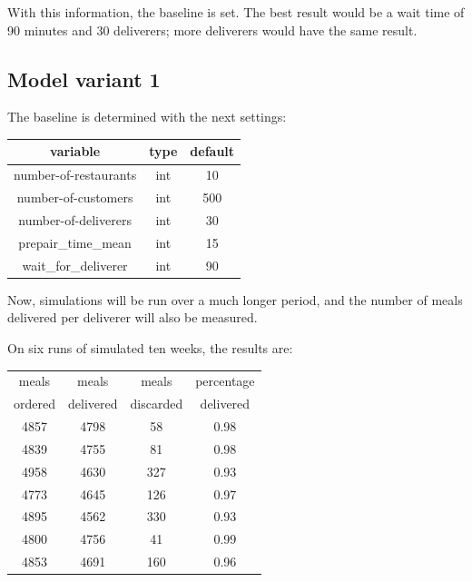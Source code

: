 With this information, the baseline is set.
The best result would be a wait time of 90 minutes and 30 deliverers; more deliverers would have the same result.

\subsection{Model variant 1}\label{subsec:model-variant-1}
The baseline is determined with the next settings:
\begin{center}
    \begin{tabular}{ |c|c|c| }
        \hline
        variable              & type & default \\
        \hline
        \hline
        number-of-restaurants & int  & 10      \\
        \hline
        number-of-customers   & int  & 500     \\
        \hline
        number-of-deliverers  & int  & 30      \\
        \hline
        prepair\_time\_mean   & int  & 15      \\
        \hline
        wait\_for\_deliverer  & int  & 90      \\
        \hline
    \end{tabular}
\end{center}

Now, simulations will be run over a much longer period, and the number of meals delivered per deliverer will also be measured.

On six runs of simulated ten weeks, the results are:

\begin{center}
    \begin{tabular}{ |c|c|c|c| }
        \hline
        meals & meals & meals & percentage \\
        ordered & delivered & discarded & delivered \\
        \hline
        \hline
        4857          & 4798           & 58             & 0.98                 \\
        \hline
        4839          & 4755           & 81             & 0.98                 \\
        \hline
        4958          & 4630           & 327             & 0.93                 \\
        \hline
        4773          & 4645           & 126             & 0.97                 \\
        \hline
        4895          & 4562           & 330             & 0.93                 \\
        \hline
        4800          & 4756           & 41             & 0.99                 \\
        \hline
        \hline
        4853          & 4691           & 160             & 0.96 \\
        \hline
    \end{tabular}
\end{center}

